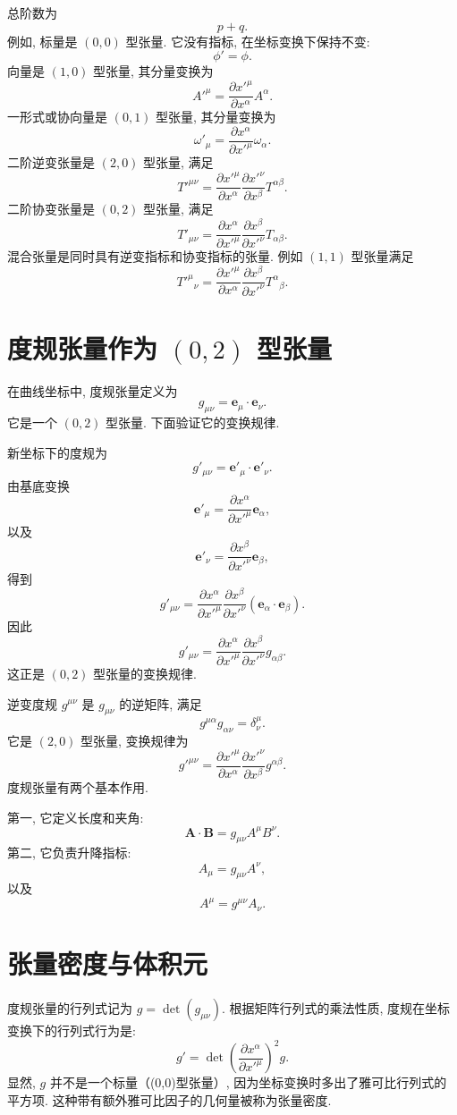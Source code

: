 总阶数为
\[
p+q.
\]
例如, 标量是 $(0,0)$ 型张量. 它没有指标, 在坐标变换下保持不变: 
\[
\phi'=\phi.
\]
向量是 $(1,0)$ 型张量, 其分量变换为
\[
A'^\mu
=
\frac{\partial x'^\mu}{\partial x^\alpha}A^\alpha.
\]
一形式或协向量是 $(0,1)$ 型张量, 其分量变换为
\[
\omega'_\mu
=
\frac{\partial x^\alpha}{\partial x'^\mu}\omega_\alpha.
\]
二阶逆变张量是 $(2,0)$ 型张量, 满足
\[
T'^{\mu\nu}
=
\frac{\partial x'^\mu}{\partial x^\alpha}
\frac{\partial x'^\nu}{\partial x^\beta}
T^{\alpha\beta}.
\]
二阶协变张量是 $(0,2)$ 型张量, 满足
\[
T'_{\mu\nu}
=
\frac{\partial x^\alpha}{\partial x'^\mu}
\frac{\partial x^\beta}{\partial x'^\nu}
T_{\alpha\beta}.
\]
混合张量是同时具有逆变指标和协变指标的张量. 例如 $(1,1)$ 型张量满足
\[
T'^\mu{}_\nu
=
\frac{\partial x'^\mu}{\partial x^\alpha}
\frac{\partial x^\beta}{\partial x'^\nu}
T^\alpha{}_\beta.
\]
\section{度规张量作为 $(0,2)$ 型张量}

在曲线坐标中, 度规张量定义为
\[
g_{\mu\nu}
=
\bm{e}_\mu\cdot\bm{e}_\nu.
\]
它是一个 $(0,2)$ 型张量. 下面验证它的变换规律. 

新坐标下的度规为
\[
g'_{\mu\nu}
=
\bm{e}'_\mu\cdot\bm{e}'_\nu.
\]
由基底变换
\[
\bm{e}'_\mu
=
\frac{\partial x^\alpha}{\partial x'^\mu}
\bm{e}_\alpha,
\]
以及
\[
\bm{e}'_\nu
=
\frac{\partial x^\beta}{\partial x'^\nu}
\bm{e}_\beta,
\]
得到
\[
g'_{\mu\nu}
=
\frac{\partial x^\alpha}{\partial x'^\mu}
\frac{\partial x^\beta}{\partial x'^\nu}
(\bm{e}_\alpha\cdot\bm{e}_\beta).
\]
因此
\[
g'_{\mu\nu}
=
\frac{\partial x^\alpha}{\partial x'^\mu}
\frac{\partial x^\beta}{\partial x'^\nu}
g_{\alpha\beta}.
\]
这正是 $(0,2)$ 型张量的变换规律. 

逆变度规 $g^{\mu\nu}$ 是 $g_{\mu\nu}$ 的逆矩阵, 满足
\[
g^{\mu\alpha}g_{\alpha\nu}
=
\delta^\mu_\nu.
\]
它是 $(2,0)$ 型张量, 变换规律为
\[
g'^{\mu\nu}
=
\frac{\partial x'^\mu}{\partial x^\alpha}
\frac{\partial x'^\nu}{\partial x^\beta}
g^{\alpha\beta}.
\]
度规张量有两个基本作用. 

第一, 它定义长度和夹角: 
\[
\bm{A}\cdot\bm{B}
=
g_{\mu\nu}A^\mu B^\nu.
\]
第二, 它负责升降指标: 
\[
A_\mu=g_{\mu\nu}A^\nu,
\]
以及
\[
A^\mu=g^{\mu\nu}A_\nu.
\]
\section{张量密度与体积元}

度规张量的行列式记为 $g = \det(g_{\mu\nu})$. 根据矩阵行列式的乘法性质, 度规在坐标变换下的行列式行为是: 
\[
g' = \det\left( \frac{\partial x^\alpha}{\partial x'^\mu} \right)^2 g.
\]
显然, $g$ 并不是一个标量（(0,0)型张量）, 因为坐标变换时多出了雅可比行列式的平方项. 这种带有额外雅可比因子的几何量被称为张量密度. 

